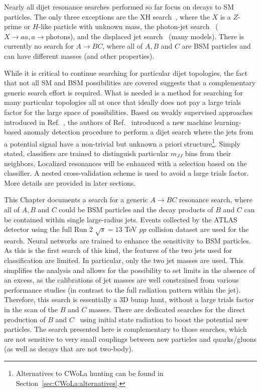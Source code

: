 Nearly all dijet resonance searches performed so far focus on decays to SM particles.  The only three exceptions are the XH search~\cite{Aaboud:2018eoy,Aaboud:2017ecz}, where the $X$ is a $Z$-prime or $H$-like particle with unknown mass, the photon-jet search~\cite{Aaboud:2018djx} ($X\rightarrow aa, a\rightarrow \text{photons}$), and the displaced jet search~\cite{Aaboud:2018aqj} (many models).  There is currently no search for $A\rightarrow BC$, where all of $A,B$ and $C$ are BSM particles and can have different masses (and other properties).

While it is critical to continue searching for particular dijet topologies, the fact that not all SM and BSM possibilities are covered suggests that a complementary generic search effort is required.  What is needed is a method for searching for many particular topologies all at once that ideally does not pay a large trials factor for the large space of possibilities.  Based on weakly supervised approaches introduced in Ref.~\cite{Metodiev:2017vrx}, the authors of Ref.~\cite{Collins:2018epr,Collins:2019jip} introduced a new machine learning-based anomaly detection procedure to perform a dijet search where the jets from a potential signal have a non-trivial but unknown a priori structure\footnote{Alternatives to CWoLa hunting can be found in Section~\ref{sec:CWoLa:alternatives}.}.  Simply stated, classifiers are trained to distinguish particular $m_{JJ}$ bins from their neighbors.  Localized resonances will be enhanced with a selection based on the classifier.  A nested cross-validation scheme is used to avoid a large trials factor.  More details are provided in later sections.

This Chapter documents a search for a generic $A\rightarrow BC$ resonance search, where all of $A,B$ and $C$ could be BSM particles and the decay products of $B$ and $C$ can be contained within single large-radius jets.  Events collected by the ATLAS detector using the full Run 2 $\sqrt{s}=13$ TeV $pp$ collision dataset are used for the search.  Neural networks are trained to enhance the sensitivity to BSM particles.  As this is the first search of this kind, the features of the two jets used for classification are limited.  In particular, only the two jet masses are used.  This simplifies the analysis and allows for the possibility to set limits in the absence of an excess, as the calibrations of jet masses are well constrained from various performance studies (in contrast to the full radiation pattern within the jet).  Therefore, this search is essentially a 3D bump hunt, without a large trials factor in the scan of the $B$ and $C$ masses.  There are dedicated searches for the direct production of $B$ and $C$~\cite{Aaboud:2018zba,Aaboud:2018fzt,Aaboud:2018zba} using initial state radiation to boost the potential new particles.  The search presented here is complementary to those searches, which are not sensitive to very small couplings between new particles and quarks/gluons (as well as decays that are not two-body).

